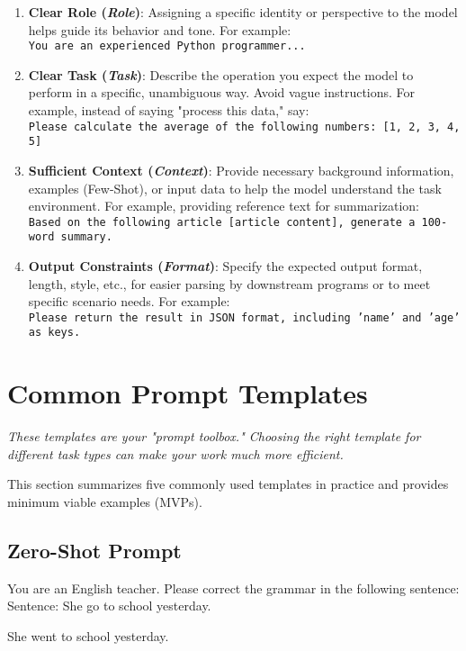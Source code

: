 \documentclass[12pt]{article}
\newcommand{\chapternote}[1]{\vspace{-0.3cm}\par\noindent\textit{\small #1}\vspace{0.3cm}}
\begin{document}
\begin{enumerate}[wide, labelwidth=!, labelsep=1em]
  \item \textbf{Clear Role (\emph{Role})}: Assigning a specific identity or perspective to the model helps guide its behavior and tone. For example:\\
  \texttt{You are an experienced Python programmer...}
  \item \textbf{Clear Task (\emph{Task})}: Describe the operation you expect the model to perform in a specific, unambiguous way. Avoid vague instructions. For example, instead of saying "process this data," say:\\
  \texttt{Please calculate the average of the following numbers: [1, 2, 3, 4, 5]}
  \item \textbf{Sufficient Context (\emph{Context})}: Provide necessary background information, examples (Few-Shot), or input data to help the model understand the task environment. For example, providing reference text for summarization:\\
  \texttt{Based on the following article [article content], generate a 100-word summary.}
  \item \textbf{Output Constraints (\emph{Format})}: Specify the expected output format, length, style, etc., for easier parsing by downstream programs or to meet specific scenario needs. For example:\\
  \texttt{Please return the result in JSON format, including 'name' and 'age' as keys.}
\end{enumerate}

\section{Common Prompt Templates}
\chapternote{These templates are your "prompt toolbox." Choosing the right template for different task types can make your work much more efficient.}

This section summarizes five commonly used templates in practice and provides minimum viable examples (MVPs).

\subsection{Zero-Shot Prompt}
\begin{promptbox}
You are an English teacher. Please correct the grammar in the following sentence:\\
Sentence: She go to school yesterday.
\end{promptbox}
\begin{outputbox}
She went to school yesterday.
\end{outputbox}
\end{document}
